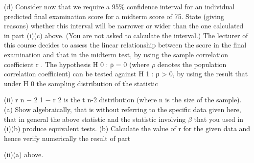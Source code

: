 \documentclass[a4paper,12pt]{article}
\begin{document}
(d) Consider now that we require a 95\% confidence interval for an individual predicted final examination score for a midterm score of 75.
State (giving reasons) whether this interval will be narrower or wider than the one calculated in part (i)(c) above. (You are not asked to calculate the interval.)
The lecturer of this course decides to assess the linear relationship between the score in the final examination and that in the midterm test, by using the sample correlation coefficient r .
The hypothesis H 0 : ρ = 0 (where $\rho$ denotes the population correlation coefficient) can be tested against H 1 : ρ > 0, by using the result that under H 0 the sampling distribution
of the statistic
\item (ii)
r n − 2
1 − r 2
is the t n-2 distribution (where n is the size of the sample).
(a) Show algebraically, that is without referring to the specific data given here, that in general the above statistic and the statistic involving $\beta$ that you used in  (i)(b) produce equivalent tests.
(b) Calculate the value of r for the given data and hence verify numerically the result of part \item (ii)(a) above.
\newpage
\end{document}
